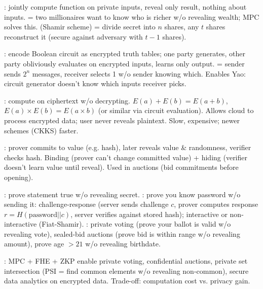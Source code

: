 : jointly compute function on private inputs, reveal only result, nothing about inputs.  = two millionaires want to know who is richer w/o revealing wealth; MPC solves this.  (Shamir scheme) = divide secret into $n$ shares, any $t$ shares reconstruct it (secure against adversary with $t-1$ shares). 

: encode Boolean circuit as encrypted truth tables; one party generates, other party obliviously evaluates on encrypted inputs, learns only output.  = sender sends $2^n$ messages, receiver selects 1 w/o sender knowing which. Enables Yao: circuit generator doesn't know which inputs receiver picks.

: compute on ciphertext w/o decrypting. $E(a) + E(b) = E(a+b)$, $E(a) \times E(b) = E(a \times b)$ (or similar via circuit evaluation). Allows cloud to process encrypted data; user never reveals plaintext. Slow, expensive; newer schemes (CKKS) faster.

: prover commits to value (e.g. hash), later reveals value \& randomness, verifier checks hash. Binding (prover can't change committed value) + hiding (verifier doesn't learn value until reveal). Used in auctions (bid commitments before opening).

: prove statement true w/o revealing secret. : prove you know password w/o sending it: challenge-response (server sends challenge $c$, prover computes response $r = H(\text{password} || c)$, server verifies against stored hash); interactive or non-interactive (Fiat-Shamir). : private voting (prove your ballot is valid w/o revealing vote), sealed-bid auctions (prove bid is within range w/o revealing amount), prove age $> 21$ w/o revealing birthdate.

: MPC + FHE + ZKP enable private voting, confidential auctions, private set intersection (PSI = find common elements w/o revealing non-common), secure data analytics on encrypted data. Trade-off: computation cost vs. privacy gain.
